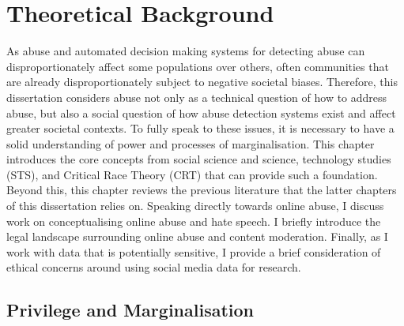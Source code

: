 

\chapter{Theoretical Background}\label{chap:socialscience}
As abuse and automated decision making systems for detecting abuse can disproportionately affect some populations over others, often communities that are already disproportionately subject to negative societal biases.
Therefore, this dissertation considers abuse not only as a technical question of how to address abuse, but also a social question of how abuse detection systems exist and affect greater societal contexts.
To fully speak to these issues, it is necessary to have a solid understanding of power and processes of marginalisation.
This chapter introduces the core concepts from social science and science, technology studies (STS), and Critical Race Theory (CRT) that can provide such a foundation. 
Beyond this, this chapter reviews the previous literature that the latter chapters of this dissertation relies on. 
Speaking directly towards online abuse, I discuss work on conceptualising online abuse and hate speech.
I briefly introduce the legal landscape surrounding online abuse and content moderation.
Finally, as I work with data that is potentially sensitive, I provide a brief consideration of ethical concerns around using social media data for research.


\section{Privilege and Marginalisation}

